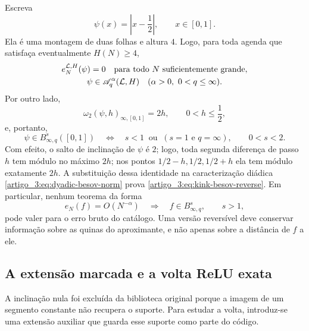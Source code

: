Escreva
\begin{equation}
 \psi(x)=\left|x-\frac12\right|,
 \qquad x\in[0,1].
 \label{artigo_3:eq:reverse-kink}
\end{equation}
Ela é uma montagem de duas folhas e altura $4$. Logo, para toda agenda que
satisfaça eventualmente $H(N)\ge4$,
\begin{equation}
 \begin{gathered}
 e_N^{\mathcal{L},H}(\psi)=0
 \quad\text{para todo $N$ suficientemente grande},\\
 \psi\in\mathscr A_q^\alpha(\mathcal{L},H)
 \quad(\alpha>0,\ 0<q\le\infty).
 \end{gathered}
 \label{artigo_3:eq:kink-zero-raw-error}
\end{equation}
Por outro lado,
\begin{equation}
 \omega_2(\psi,h)_{\infty,[0,1]}=2h,
 \qquad 0<h\le\frac12,
 \label{artigo_3:eq:kink-exact-modulus-reverse}
\end{equation}
e, portanto,
\begin{equation}
 \psi\in B^s_{\infty,q}([0,1])
 \quad\Longleftrightarrow\quad
 s<1\ \text{ ou }\ (s=1\text{ e }q=\infty),
 \qquad 0<s<2.
 \label{artigo_3:eq:kink-besov-reverse}
\end{equation}
Com efeito, o salto de inclinação de $\psi$ é $2$; logo, toda segunda diferença
de passo $h$ tem módulo no máximo $2h$; nos pontos
$1/2-h,1/2,1/2+h$ ela tem módulo exatamente $2h$. A substituição dessa identidade
na caracterização diádica \eqref{artigo_3:eq:dyadic-besov-norm} prova
\eqref{artigo_3:eq:kink-besov-reverse}. Em particular, nenhum
teorema da forma
\begin{equation}
 e_N(f)=O(N^{-\alpha})\quad\Longrightarrow\quad
 f\in B^s_{\infty,q},
 \qquad s>1,
 \label{artigo_3:eq:forbidden-unregularized-converse}
\end{equation}
pode valer para o erro bruto do catálogo. Uma versão reversível deve conservar
informação sobre as quinas do aproximante, e não apenas sobre a distância de
$f$ a ele.

\subsection{A extensão marcada e a volta ReLU exata}

A inclinação nula foi
excluída da biblioteca original porque a imagem de um segmento constante não
recupera o suporte. Para estudar a volta, introduz-se uma extensão auxiliar
que guarda esse suporte como parte do código.

